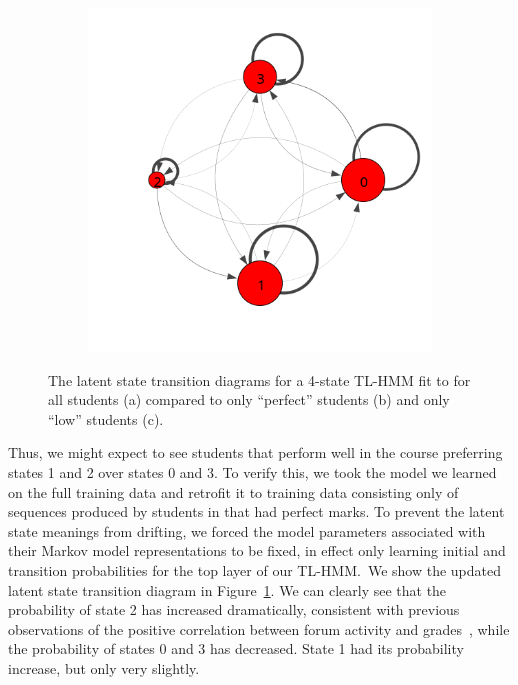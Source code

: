 \begin{figure}
\begin{subfigure}[t]{0.33\textwidth}
    \caption{\label{fig:trans-perfect}}
  \end{subfigure}%
  \begin{subfigure}[t]{0.33\textwidth}
    \includegraphics[width=\textwidth,trim={0, 3cm 0 2cm}]{figures/trans-comp/trans-low.png}
    \caption{\label{fig:trans-low}}
  \end{subfigure}
  \caption{The latent state transition diagrams for a 4-state TL-HMM fit to
  \protect\textretrieval{} for all students (a) compared to only ``perfect''
  students (b) and only ``low'' students (c).}
  \label{fig:trans-comp}
\end{figure}

Thus, we might expect to see students that perform well in the course
preferring states 1 and 2 over states 0 and 3. To verify this, we took the
model we learned on the full training data and retrofit it to training data
consisting only of sequences produced by students in \textretrieval{} that
had perfect marks. To prevent the latent state meanings from drifting, we
forced the model parameters associated with their Markov model
representations to be fixed, in effect only learning initial and transition
probabilities for the top layer of our TL-HMM.\ We show the updated latent
state transition diagram in Figure~\ref{fig:trans-perfect}. We can clearly
see that the probability of state 2 has increased dramatically, consistent
with previous observations of the positive correlation between forum activity and
grades~\cite{Huang:2014:LAS}, while the probability of states 0 and 3 has
decreased. State 1 had its probability increase, but only very slightly.


